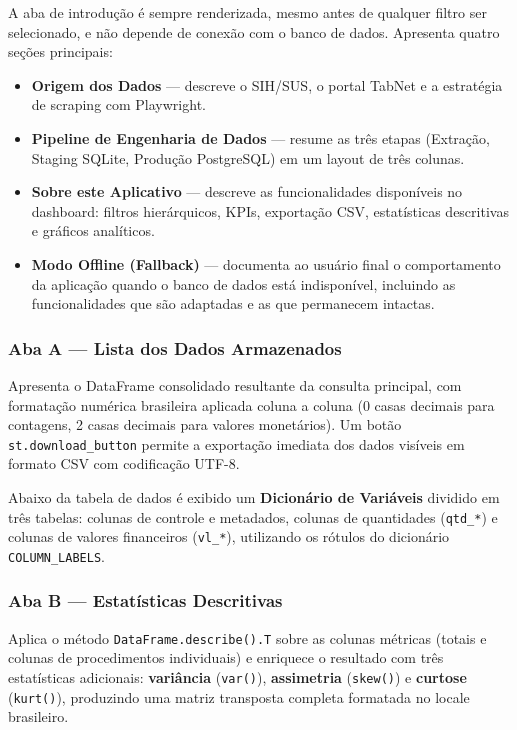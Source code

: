 \documentclass[12pt,a4paper]{report}
\begin{document}
A aba de introdução é sempre renderizada, mesmo antes de qualquer filtro ser
selecionado, e não depende de conexão com o banco de dados. Apresenta quatro seções
principais:

\begin{itemize}
    \item \textbf{Origem dos Dados} — descreve o SIH/SUS, o portal TabNet e a
    estratégia de scraping com Playwright.
    \item \textbf{Pipeline de Engenharia de Dados} — resume as três etapas
    (Extração, Staging SQLite, Produção PostgreSQL) em um layout de três colunas.
    \item \textbf{Sobre este Aplicativo} — descreve as funcionalidades disponíveis no
    dashboard: filtros hierárquicos, KPIs, exportação CSV, estatísticas descritivas e
    gráficos analíticos.
    \item \textbf{Modo Offline (Fallback)} — documenta ao usuário final o
    comportamento da aplicação quando o banco de dados está indisponível, incluindo as
    funcionalidades que são adaptadas e as que permanecem intactas.
\end{itemize}

\subsubsection*{Aba A — Lista dos Dados Armazenados}

Apresenta o DataFrame consolidado resultante da consulta principal, com formatação
numérica brasileira aplicada coluna a coluna (0 casas decimais para contagens,
2 casas decimais para valores monetários). Um botão \texttt{st.download\_button}
permite a exportação imediata dos dados visíveis em formato CSV com codificação UTF-8.

Abaixo da tabela de dados é exibido um \textbf{Dicionário de Variáveis} dividido em
três tabelas: colunas de controle e metadados, colunas de quantidades (\texttt{qtd\_*})
e colunas de valores financeiros (\texttt{vl\_*}), utilizando os rótulos do dicionário
\texttt{COLUMN\_LABELS}.

\subsubsection*{Aba B — Estatísticas Descritivas}

Aplica o método \texttt{DataFrame.describe().T} sobre as colunas métricas (totais e
colunas de procedimentos individuais) e enriquece o resultado com três estatísticas
adicionais: \textbf{variância} (\texttt{var()}), \textbf{assimetria}
(\texttt{skew()}) e \textbf{curtose} (\texttt{kurt()}), produzindo uma matriz
transposta completa formatada no locale brasileiro.
\end{document}
